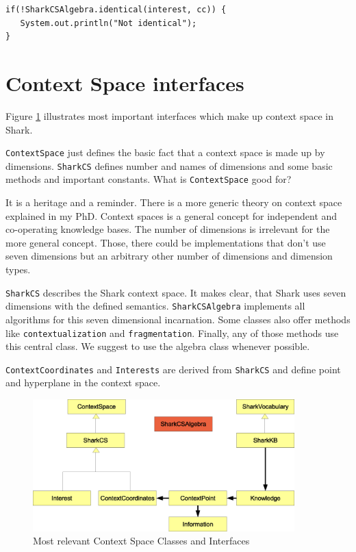 \begin{verbatim}
if(!SharkCSAlgebra.identical(interest, cc)) {
   System.out.println("Not identical");
}
\end{verbatim}

\section{Context Space interfaces}
Figure \ref{fig:contextSpaceHierarchy} illustrates most important interfaces which make up context space in Shark.

{\tt ContextSpace} just defines the basic fact that a context space is made up by dimensions. {\tt SharkCS} defines number and names of dimensions and some basic methods and important constants. What is {\tt ContextSpace} good for?

It is a heritage and a reminder. There is a more generic theory on context space explained in my PhD. Context spaces is a general concept for independent and co-operating knowledge bases. The number of dimensions is irrelevant for the more general concept. Those, there could be implementations that don't use seven dimensions but an arbitrary other number of dimensions and dimension types.

{\tt SharkCS} describes the Shark context space. It makes clear, that Shark uses seven dimensions with the defined semantics. {\tt SharkCSAlgebra} implements all algorithms for this seven dimensional incarnation. Some classes also offer methods like {\tt contextualization} and {\tt fragmentation}. Finally, any of those methods use this central class. We suggest to use the algebra class whenever possible.

{\tt ContextCoordinates} and {\tt Interests} are derived from {\tt SharkCS} and define point and hyperplane in the context space.

\begin{figure}[t]
\centering
\includegraphics[width=0.90\textwidth]{CSInterfaces.eps}
\caption{Most relevant Context Space Classes and Interfaces}
\label{fig:contextSpaceHierarchy}
\end{figure}

